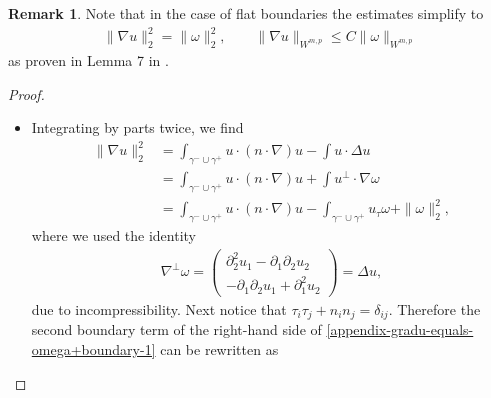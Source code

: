 \documentclass{article}
\theoremstyle{definition}
\theoremstyle{definition}
\newtheorem{remark}{Remark}[section]
\begin{document}
\begin{remark}
Note that in the case of flat boundaries the estimates simplify to
\begin{align*}
    \|\nabla u\|_2^2 = \|\omega\|_2^2, \qquad \|\nabla u\|_{W^{m,p}} \leq C \|\omega\|_{W^{m,p}}
\end{align*}
as proven in Lemma 7 in \cite{drivasNguyenNobiliBoundsOnHeatFluxForRayleighBenardConvectionBetweenNavierSlipFixedTemperatureBoundaries}.
\end{remark}

\begin{proof}
\leavevmode
\begin{itemize}
    \item
    Integrating by parts twice, we find
    \begin{equation}
        \label{appendix-gradu-equals-omega+boundary-1}
        \begin{aligned}
            \|\nabla u\|_2^2 &= \int_{\gamma^-\cup\gamma^+} u \cdot (n \cdot \nabla) u - \int u \cdot \Delta u 
            \\
            &= \int_{\gamma^-\cup\gamma^+} u \cdot (n \cdot \nabla) u + \int u^\perp \cdot \nabla \omega 
            \\
            &= \int_{\gamma^-\cup\gamma^+} u \cdot (n \cdot \nabla) u - \int_{\gamma^-\cup\gamma^+} u_\tau \omega + \|\omega\|_2^2,
        \end{aligned}
    \end{equation}
    where we used the identity
     \begin{align*}
        \nabla^\perp \omega = \begin{pmatrix}\partial_2^2 u_1 -\partial_1\partial_2 u_2\\-\partial_1\partial_2 u_1 +\partial_1^2 u_2\end{pmatrix} = \Delta u,
    \end{align*}
    due to incompressibility.
    Next notice that $\tau_i\tau_j + n_in_j = \delta_{ij}$. Therefore the second boundary term of the right-hand side of \eqref{appendix-gradu-equals-omega+boundary-1} can be rewritten as

\end{itemize}
\end{proof}
\end{document}
